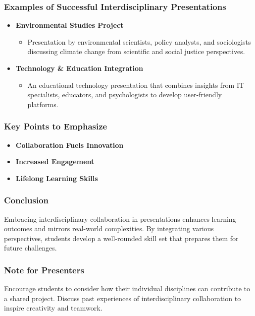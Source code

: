 \documentclass{beamer}
\begin{document}
\begin{frame}[fragile]
    \frametitle{Examples of Successful Interdisciplinary Presentations}
    \begin{itemize}
        \item \textbf{Environmental Studies Project}
        \begin{itemize}
            \item Presentation by environmental scientists, policy analysts, and sociologists discussing climate change from scientific and social justice perspectives.
        \end{itemize}
        
        \item \textbf{Technology \& Education Integration}
        \begin{itemize}
            \item An educational technology presentation that combines insights from IT specialists, educators, and psychologists to develop user-friendly platforms.
        \end{itemize}
    \end{itemize}
\end{frame}

\begin{frame}[fragile]
    \frametitle{Key Points to Emphasize}
    \begin{itemize}
        \item \textbf{Collaboration Fuels Innovation}
        \item \textbf{Increased Engagement}
        \item \textbf{Lifelong Learning Skills} 
    \end{itemize}
\end{frame}

\begin{frame}[fragile]
    \frametitle{Conclusion}
    Embracing interdisciplinary collaboration in presentations enhances learning outcomes and mirrors real-world complexities. By integrating various perspectives, students develop a well-rounded skill set that prepares them for future challenges.
\end{frame}

\begin{frame}[fragile]
    \frametitle{Note for Presenters}
    Encourage students to consider how their individual disciplines can contribute to a shared project. Discuss past experiences of interdisciplinary collaboration to inspire creativity and teamwork.
\end{frame}
\end{document}
